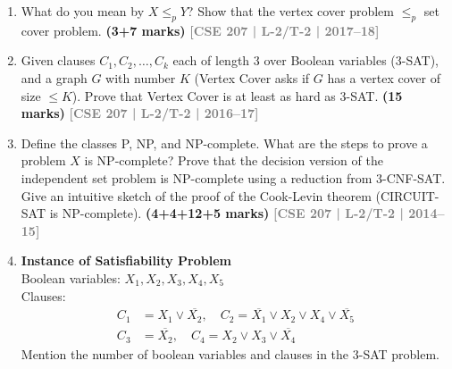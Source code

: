 \documentclass[12pt]{article}
\newcommand{\yr}[1]{\hfill\textcolor{gray}{\small\textbf{[#1]}}}
\newcommand{\mk}[1]{\textcolor{orange!70!black}{\small\textbf{(#1 marks)}}}
\begin{document}
\begin{enumerate}
\item What do you mean by $X \leq_p Y$? Show that the vertex cover problem $\leq_p$ set cover problem. \mk{3+7}
\yr{CSE 207 | L-2/T-2 | 2017--18}


\item Given clauses $C_1, C_2, \ldots, C_k$ each of length 3 over Boolean variables (3-SAT), and a graph $G$ with number $K$ (Vertex Cover asks if $G$ has a vertex cover of size $\leq K$). Prove that Vertex Cover is at least as hard as 3-SAT. \mk{15}
\yr{CSE 207 | L-2/T-2 | 2016--17}




\item Define the classes P, NP, and NP-complete. What are the steps to prove a problem $X$ is NP-complete? Prove that the decision version of the independent set problem is NP-complete using a reduction from 3-CNF-SAT. Give an intuitive sketch of the proof of the Cook-Levin theorem (CIRCUIT-SAT is NP-complete). \mk{4+4+12+5}
\yr{CSE 207 | L-2/T-2 | 2014--15}



\item \textbf{Instance of Satisfiability Problem}\\
Boolean variables: $X_1, X_2, X_3, X_4, X_5$\\
Clauses:
\begin{align*}
C_1 &= X_1 \vee \overline{X_2}, \quad C_2 = \overline{X_1} \vee X_2 \vee X_4 \vee \overline{X_5}\\
C_3 &= \overline{X_2}, \quad C_4 = X_2 \vee X_3 \vee \overline{X_4}
\end{align*}
Mention the number of boolean variables and clauses in the 3-SAT problem.



\end{enumerate}
\end{document}
